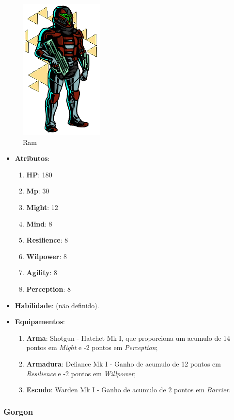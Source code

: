 \documentclass[11pt]{article} %
\begin{document}
\begin{figure}[!htp]
\centering
\includegraphics[scale=0.5]{res/characters/Ram.png}
\caption{Ram}
\label{Ram}
\end{figure}

\begin{itemize}
\item \textbf{Atributos}:
  \begin{enumerate}
    \item \textbf{HP}: 180
    \item \textbf{Mp}: 30
    \item \textbf{Might}: 12
    \item \textbf{Mind}: 8
    \item \textbf{Resilience}: 8
    \item \textbf{Wilpower}: 8
    \item \textbf{Agility}: 8
    \item \textbf{Perception}: 8
  \end{enumerate}
\item \textbf{Habilidade}: (não definido).
\item \textbf{Equipamentos}:
  \begin{enumerate}
    \item \textbf{Arma}: Shotgun - Hatchet Mk I, que proporciona um acumulo de 14 pontos em \textit{Might} e -2 pontos em \textit{Perception};
    \item \textbf{Armadura}: Defiance Mk I - Ganho de acumulo de 12 pontos em \textit{Resilience} e -2 pontos em \textit{Willpower};
    \item \textbf{Escudo}: Warden Mk I - Ganho de acumulo de 2 pontos em \textit{Barrier}.
  \end{enumerate}
\end{itemize}

\subsubsection{Gorgon}
\end{document}
